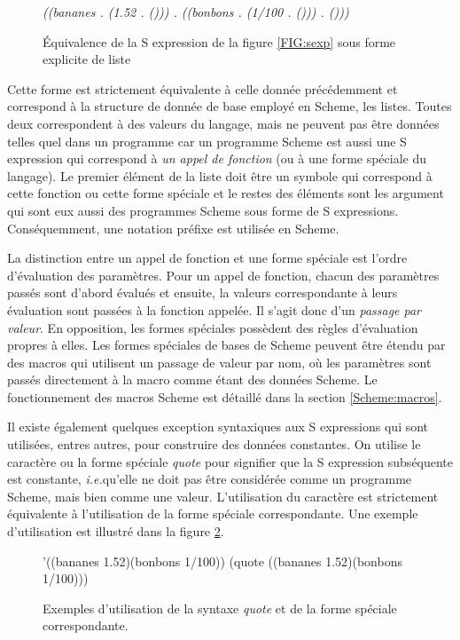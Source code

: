 \documentclass[12pt,oneside,letterpaper,francais]{book}
\newcommand{\ie}{{\textit{i.e.}}}
\newcommand{\scheme}[1]{\selectlanguage{english}{\tt #1}\selectlanguage{french}}
\begin{document}
\begin{figure}[htb!]
{{\it
    ((bananes . (1.52 . ())) . ((bonbons . (1/100 . ())) . ()))
    }}
  \caption{Équivalence de la S expression de la figure \ref{FIG:sexp}
    sous forme explicite de liste}
  \label{FIG:sexp->list}
\end{figure}

Cette forme est strictement équivalente à celle donnée précédemment et
correspond à la structure de donnée de base employé en Scheme, les
listes. Toutes deux correspondent à des valeurs du langage, mais ne
peuvent pas être données telles quel dans un programme car un
programme Scheme est aussi une S expression qui correspond à \emph{un
  appel de fonction} (ou à une forme spéciale du langage). Le premier
élément de la liste doit être un symbole qui correspond à cette
fonction ou cette forme spéciale et le restes des éléments sont les
argument qui sont eux aussi des programmes Scheme sous forme de S
expressions. Conséquemment, une notation préfixe est utilisée en
Scheme.

La distinction entre un appel de fonction et une forme spéciale est
l'ordre d'évaluation des paramètres. Pour un appel de fonction, chacun
des paramètres passés sont d'abord évalués et ensuite, la valeurs
correspondante à leurs évaluation sont passées à la fonction
appelée. Il s'agit donc d'un \emph{passage par valeur}. En opposition,
les formes spéciales possèdent des règles d'évaluation propres à
elles. Les formes spéciales de bases de Scheme peuvent être étendu par
des macros qui utilisent un passage de valeur par nom, où les
paramètres sont passés directement à la macro comme étant des données
Scheme. Le fonctionnement des macros Scheme est détaillé dans la
section \ref{Scheme:macros}.

Il existe également quelques exception syntaxiques aux S expressions
qui sont utilisées, entres autres, pour construire des données
constantes. On utilise le caractère \scheme{'} ou la forme spéciale
\textit{quote} pour signifier que la S expression subséquente est
constante, \ie  qu'elle ne doit pas être considérée comme un
programme Scheme, mais bien comme une valeur. L'utilisation du
caractère \scheme{è} est strictement équivalente à l'utilisation de la
forme spéciale correspondante. Une exemple d'utilisation est illustré
dans la figure \ref{FIG:quote}.\\


\begin{figure}[htb!]
  \begin{schemecode}
'((bananes 1.52)(bonbons 1/100))
(quote ((bananes 1.52)(bonbons 1/100)))
  \end{schemecode}
  \caption{Exemples d'utilisation de la syntaxe \textit{quote} et de
    la forme spéciale correspondante.}
  \label{FIG:quote}
\end{figure}
\end{document}
